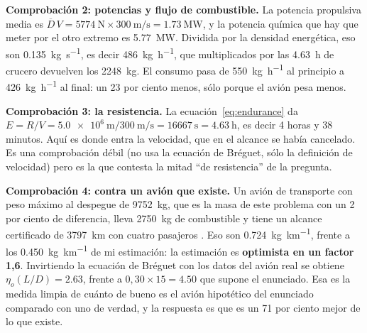 \documentclass[11pt,letterpaper]{article}
\begin{document}
\textbf{Comprobación 2: potencias y flujo de combustible.} La potencia
propulsiva media es \(\overline{D}\,V = \SI{5774}{\newton} \times
\SI{300}{\meter\per\second} = \SI{1.73}{\mega\watt}\), y la potencia química
que hay que meter por el otro extremo es \SI{5.77}{\mega\watt}. Dividida por
la densidad energética, eso son \SI{0.135}{\kilogram\per\second}, es decir
\SI{486}{\kilogram\per\hour}, que multiplicados por las \SI{4.63}{\hour} de
crucero devuelven los \SI{2248}{\kilogram}. El consumo pasa de
\SI{550}{\kilogram\per\hour} al principio a \SI{426}{\kilogram\per\hour} al
final: un 23 por ciento menos, sólo porque el avión pesa menos.

\textbf{Comprobación 3: la resistencia.} La ecuación~\eqref{eq:endurance} da
\(E = R/V = \SI{5.0e6}{\meter}/\SI{300}{\meter\per\second} = \SI{16667}{\second}
= \SI{4.63}{\hour}\), es decir 4 horas y 38 minutos. Aquí es donde entra la
velocidad, que en el alcance se había cancelado. Es una comprobación débil (no
usa la ecuación de Bréguet, sólo la definición de velocidad) pero es la que
contesta la mitad \enquote{de resistencia} de la pregunta.

\textbf{Comprobación 4: contra un avión que existe.} Un avión de transporte con
peso máximo al despegue de \SI{9752}{\kilogram}, que es la masa de este
problema con un 2 por ciento de diferencia, lleva \SI{2750}{\kilogram} de
combustible y tiene un alcance certificado de \SI{3797}{\kilo\meter} con cuatro
pasajeros \parencite{learjet75,aopalearjet}. Eso son
\SI{0.724}{\kilogram\per\kilo\meter}, frente a los
\SI{0.450}{\kilogram\per\kilo\meter} de mi estimación: la estimación es
\textbf{optimista en un factor 1,6}. Invirtiendo la ecuación de Bréguet con los
datos del avión real se obtiene \(\eta_o (L/D) = \num{2.63}\), frente a
\(0{,}30\times 15 = \num{4.50}\) que supone el enunciado. Esa es la medida
limpia de cuánto de bueno es el avión hipotético del enunciado comparado con
uno de verdad, y la respuesta es que es un 71 por ciento mejor de lo que existe.
\end{document}
